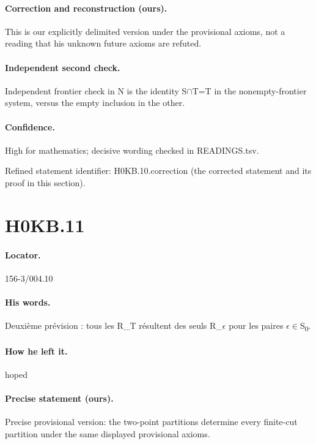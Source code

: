 \paragraph{Correction and reconstruction (ours).} This is our explicitly delimited version under the provisional axioms, not a reading that his unknown future axioms are refuted.

\paragraph{Independent second check.} Independent frontier check in N is the identity S\ensuremath{\cap}T=T in the nonempty-frontier system, versus the empty inclusion in the other.

\paragraph{Confidence.} High for mathematics; decisive wording checked in READINGS.tsv.

\noindent Refined statement identifier: H0KB.10.correction (the corrected statement and its proof in this section).

\section*{H0KB.11}\label{statement:H0KB.11}
\paragraph{Locator.} 156-3/004.10

\paragraph{His words.} Deuxième prévision : tous les R\_T résultent des seuls R\_\ensuremath{\epsilon} pour les paires \ensuremath{\epsilon}\ensuremath{\in}S\textsubscript{0}.

\paragraph{How he left it.} hoped

\paragraph{Precise statement (ours).} Precise provisional version: the two-point partitions determine every finite-cut partition under the same displayed provisional axioms.

